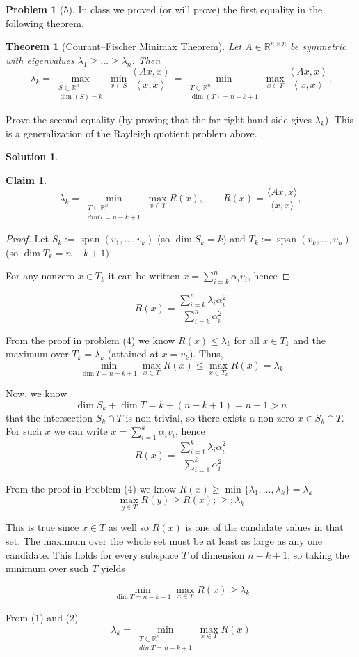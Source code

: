 \documentclass{amsart}[11pt]
\newtheorem{theorem}{Theorem}[section]
\newtheorem*{claim}{Claim}
\theoremstyle{definition}
\newtheorem*{problem}{Problem}
\newtheorem*{solution}{Solution}
\newcommand{\R}{\mathbb{R}}
\newcommand{\bracket}[1]{\left\langle#1\right\rangle}
\begin{document}
\begin{problem}[5]
 In class we proved (or will prove) the first equality in the following theorem.
\begin{theorem}[Courant--Fischer Minimax Theorem]
Let $A\in\R^{n\times n}$ be symmetric with eigenvalues $\lambda_1\geq\dots\geq\lambda_n$. Then
\[\lambda_k = \max_{\substack{S\subset\R^n\\ \dim(S)=k}}\min_{x\in S}\frac{\bracket{Ax,x}}{\bracket{x,x}} = \min_{\substack{T\subset\R^n \\ \dim(T)=n-k+1}}\max_{x\in T}\frac{\bracket{Ax,x}}{\bracket{x,x}}.\]
\end{theorem}
Prove the second equality (by proving that the far right-hand side gives $\lambda_k$). This is a generalization of the Rayleigh quotient problem above.
\begin{solution}
    \begin{claim}
        \[
\lambda_k = \min_{\substack{T\subset\R^n\\dim T=n-k+1}}\max_{x\in T} R(x),
\qquad R(x)=\frac{\langle Ax,x\rangle}{\langle x,x\rangle},
\]
    \end{claim}
    \begin{proof}
        Let $S_k:=\operatorname{span}({v_1,\dots,v_k})$ (so $\dim S_k=k)$ and $T_k:=\operatorname{span}({v_k,\dots,v_n})$ (so $\dim T_k=n-k+1)$

        For any nonzero $x\in T_k$ it can be written $x=\sum_{i=k}^n \alpha_i v_i$, hence \end{proof}

        \[   R(x)=\frac{\sum_{i=k}^n \lambda_i\alpha_i^2}{\sum_{i=k}^n \alpha_i^2}\]

        From the proof in problem (4) we know $R(x)\le\lambda_k$ for all $x\in T_k$ and the maximum over $T_k = \lambda_k$ (attained at $x=v_k$). Thus, \[\min_{\dim T=n-k+1}\max_{x\in T}R(x)\le\max_{x\in T_k}R(x)=\lambda_k\tag{1}\]

        Now, we know \[\dim S_k+\dim T = k+(n-k+1)=n+1>n\] that the intersection $S_k\cap T$ is non-trivial, so there exists a non-zero $x\in S_k\cap T$. For such $x$ we can write $x=\sum_{i=1}^k \alpha_i v_i$, hence \[   R(x)=\frac{\sum_{i=1}^k \lambda_i\alpha_i^2}{\sum_{i=1}^k \alpha_i^2}\]

        From the proof in Problem (4) we know $R(x)\ge\min{\{\lambda_1,\dots,\lambda_k\}}=\lambda_k$ \[\max_{y\in T}R(y)\ge R(x);\ge;\lambda_k\]

        This is true since $x\in T$ as well so $R(x)$ is one of the candidate values in that set. The maximum over the whole set must be at least as large as any one candidate. This holds for every subspace $T$ of dimension $n-k+1$, so taking the minimum over such $T$ yields

        \[\min_{\dim T=n-k+1}\max_{x\in T}R(x)\ge\lambda_k\tag{2}\]

        From (1) and (2)
        \[\lambda_k=\min_{\substack{T\subset\R^n\\dim T=n-k+1}}\max_{x\in T}R(x)\]
\end{solution}
\end{problem}
\end{document}
